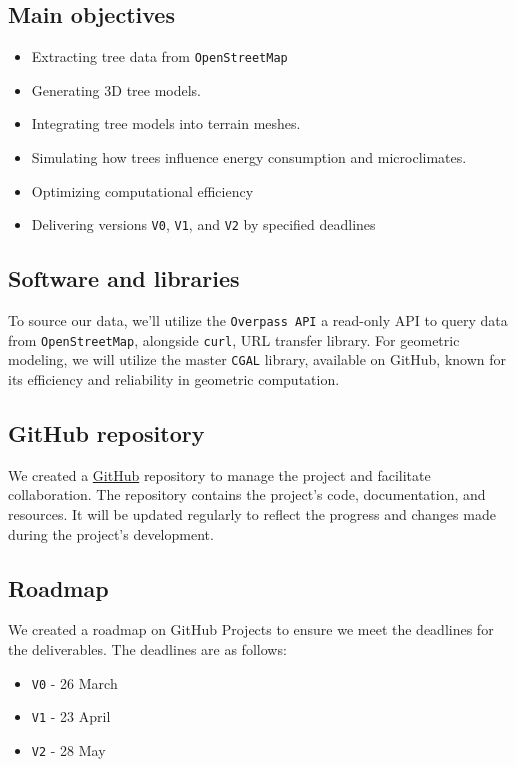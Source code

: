\documentclass[12pt]{article}
\begin{document}
\subsection{Main objectives}

\begin{itemize}
    \item Extracting tree data from \texttt{OpenStreetMap}
    \item Generating 3D tree models.
    \item Integrating tree models into terrain meshes.
    \item Simulating how trees influence energy consumption and microclimates.
    \item Optimizing computational efficiency
    \item Delivering versions \texttt{V0}, \texttt{V1}, and \texttt{V2} by specified deadlines
\end{itemize}

\newpage

\subsection{Software and libraries}
To source our data, we'll utilize the \texttt{Overpass API}\cite{overpass} a
read-only API to query data from \texttt{OpenStreetMap}, alongside
\texttt{curl}\cite{curl}, URL transfer library. For geometric modeling, we will
utilize the master \texttt{CGAL} library, available on
GitHub\cite{cgal-master}, known for its efficiency and reliability in geometric
computation.

\subsection{GitHub repository}
We created a \href{https://github.com/master-csmi/2024-m1-vegetation}{GitHub}
repository to manage the project and facilitate collaboration.
The repository contains the project's code, documentation, and resources.
It will be updated regularly to reflect the progress and changes made during
the project's development.

\subsection{Roadmap}
We created a roadmap on GitHub Projects to ensure we meet the deadlines for the
deliverables.
The deadlines are as follows:

\begin{itemize}
    \item \texttt{V0} - 26 March
    \item \texttt{V1} - 23 April
    \item \texttt{V2} - 28 May
\end{itemize}
\end{document}
